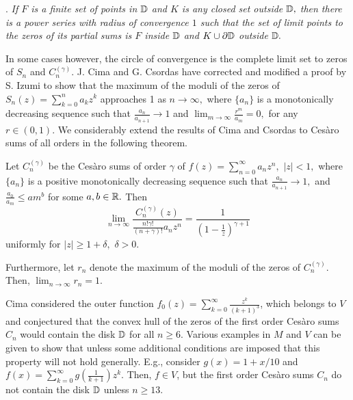 \documentclass[final]{siamltex}
\begin{document}
\vspace{4 pt}

.  {\em If $F$ is a finite set of points in ${\Bbb D}$ and $K$ is any closed set outside ${\Bbb D},$ then there is a power series with radius of convergence $1$ such that the set of limit points to the zeros of its partial sums is $F$ inside ${\Bbb D}$ and $K \cup  \partial \Bbb D$ outside ${\Bbb D}.$ }


 In some cases however, the circle of convergence is the complete limit set to zeros of $S_{n}$ and $C_{n}^{(\gamma)}.$ J. Cima and G. Csordas \cite{cim} have corrected and  modified a proof by S. Izumi \cite{izu} to show that the maximum of the moduli of the zeros of $S_{n}(z) = \sum_{k=0}^{n}a_{k}z^{k}$ approaches 1 as $n \rightarrow \infty,$ where $\{a_{n} \}$ is a monotonically decreasing sequence such that $\frac{a_{n}}{a_{n+1}} \rightarrow 1$ and $\lim_{m \rightarrow \infty} \frac{r^{m}}{a_{m}} = 0,$ for any $r \in (0,1).$ We considerably extend the results of Cima and Csordas to Ces\`{a}ro sums of all orders in the following theorem.


 \begin{theorem} 
\label{Theorem1}
Let $C_{n}^{(\gamma)}$ be the Ces\`{a}ro sums of order $\gamma$ of $f(z) = \sum_{n=0}^{\infty} a_{n}z^{n},$ $|z| < 1,$ where $\{a_{n} \}$ is a positive monotonically decreasing sequence such that $\frac{a_{n}}{a_{n+1}} \rightarrow 1,$ and  $\frac{a_{0}}{a_{m}} \leq am^{b}$ for some $a,b \in {\Bbb R}.$ 
 Then \[ \lim_{n \rightarrow \infty} \frac{ C_{n}^{(\gamma)}(z)}{\frac{n! \gamma !}{(n+ \gamma )!} a_{n}z^{n}} = \frac{1}{(1 - \frac{1}{z})^{\gamma + 1}} \] 
  uniformly for $|z| \geq 1 + \delta,$  $\delta > 0.$ 

Furthermore, let $r_{n}$ denote the maximum of the moduli of the zeros of $C_{n}^{(\gamma)}.$ Then, $\lim_{n \rightarrow \infty} r_{n} = 1.$ 

\end{theorem}

 
Cima considered the outer function $f_{0}(z) = \sum_{k=0}^{\infty} \frac{z^{k}}{(k+1)^{3}}$, which belongs to $V$ and conjectured \cite{ci}  that the convex hull of the zeros of the first order Ces\`{a}ro sums  $C_n$ would contain the disk ${\Bbb D}$ for all $n \geq 6$.  Various examples in $M$ and $V$ can be given to show that unless some additional conditions are imposed that this property will not hold generally.  E.g., consider $g(x) = 1 + x/10$ and $f(x) =  \sum_{k=0}^{\infty} g( \frac{1}{k+1}){z^{k}}.$  Then, $f \in V$, but the first order Ces\`{a}ro sums $C_n$ do not contain the disk ${\Bbb D}$ unless $n \geq 13$.
\end{document}

